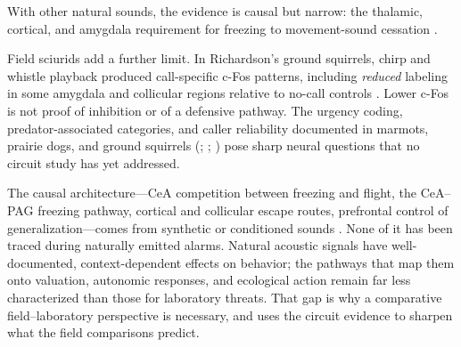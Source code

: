 With other natural sounds, the evidence is causal but narrow: the thalamic, cortical, and amygdala requirement for freezing to movement-sound cessation \citep{PereiraEtAl2020}.

Field sciurids add a further limit. In Richardson's ground squirrels, chirp and whistle playback produced call-specific c-Fos patterns, including \emph{reduced} labeling in some amygdala and collicular regions relative to no-call controls \citep{FreemanEtAl2020}. Lower c-Fos is not proof of inhibition or of a defensive pathway. The urgency coding, predator-associated categories, and caller reliability documented in marmots, prairie dogs, and ground squirrels (; ; ) pose sharp neural questions that no circuit study has yet addressed.

The causal architecture---CeA competition between freezing and flight, the CeA--PAG freezing pathway, cortical and collicular escape routes, prefrontal control of generalization---comes from synthetic or conditioned sounds \citep{FadokEtAl2017,TovoteEtAl2016,XiongEtAl2015,LiEtAl2021,ConcinaEtAl2018}. None of it has been traced during naturally emitted alarms. Natural acoustic signals have well-documented, context-dependent effects on behavior; the pathways that map them onto valuation, autonomic responses, and ecological action remain far less characterized than those for laboratory threats. That gap is why a comparative field--laboratory perspective is necessary, and  uses the circuit evidence to sharpen what the field comparisons predict.
